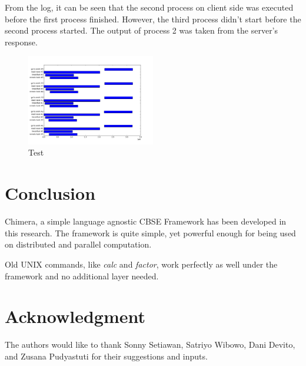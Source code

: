 \documentclass[conference]{IEEEtran}
\begin{document}
From the log, it can be seen that the second process on client side was executed before the first process finished.
However, the third process didn't start before the second process started. The output of process 2  was taken from the
server's response.


\begin{figure}
	\centering
	\includegraphics[width=0.5\textwidth]
		{test/report.png}
	\caption{Test}
	\label{fig:test}
\end{figure}

\section{Conclusion}

Chimera, a simple language agnostic CBSE Framework has been developed in this research. The framework is quite simple, yet powerful enough for being used on distributed and parallel computation.

Old UNIX commands, like {\it calc} and {\it factor}, work perfectly as well under the framework and
no additional layer needed.


\section*{Acknowledgment}

The authors would like to thank Sonny Setiawan, Satriyo Wibowo, Dani Devito, and Zusana Pudyastuti for their suggestions and inputs.

\ifCLASSOPTIONcaptionsoff
  \newpage
\fi




\end{document}
